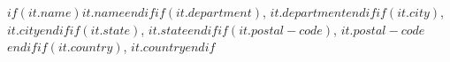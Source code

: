 $if(it.name)$$it.name$$endif$$if(it.department)$, $it.department$$endif$$if(it.city)$, $it.city$$endif$$if(it.state)$, $it.state$$endif$$if(it.postal-code)$, $it.postal-code$$endif$$if(it.country)$, $it.country$$endif$